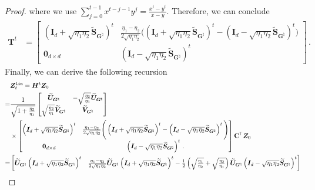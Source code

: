 \begin{proof}
    where we use $\sum_{j=0}^{t-1}x^{t-j-1}y^j=\frac{x^t-y^t}{x-y}$. Therefore, we can conclude 
    \begin{align*}
        \mathbf{T}^t & = \begin{bmatrix}
            \left(\bm I_d + \sqrt{\eta_1 \eta_2}\widetilde{\bm S}_{\bm G^\natural}\right)^t & \frac{\eta_1 - \eta_2}{2\sqrt{\eta_1 \eta_2}}\Bigg(\left(\bm I_d + \sqrt{\eta_1 \eta_2}\widetilde{\bm S}_{\bm G^\natural}\right)^t - \left(\bm I_d - \sqrt{\eta_1 \eta_2}\widetilde{\bm S}_{\bm G^\natural}\right)^t\Bigg)\\
            \bm 0_{d\times d} & \left(\bm I_d - \sqrt{\eta_1 \eta_2}\widetilde{\bm S}_{\bm G^\natural}\right)^t
        \end{bmatrix}\,.
    \end{align*}
    Finally, we can derive the following recursion
    {\begin{align*}
    & \bm Z^{\tt lin}_t
    =  \bm H^t\bm Z_0\\
    = & \frac{1}{\sqrt{1+\frac{\eta_2}{\eta_1}}}\begin{bmatrix}
        \widetilde{\bm U}_{\bm G^\natural} & -\sqrt{\frac{\eta_2}{\eta_1}}\widetilde{\bm U}_{\bm G^\natural}\\
        \sqrt{\frac{\eta_2}{\eta_1}}\widetilde{\bm V}_{\bm G^\natural} & \widetilde{\bm V}_{\bm G^\natural}
    \end{bmatrix}\\
    & \times \begin{bmatrix}
            \left(\bm I_d + \sqrt{\eta_1 \eta_2}\widetilde{\bm S}_{\bm G^\natural}\right)^t & \frac{\eta_1 - \eta_2}{2\sqrt{\eta_1 \eta_2}}\Bigg(\left(\bm I_d + \sqrt{\eta_1 \eta_2}\widetilde{\bm S}_{\bm G^\natural}\right)^t - \left(\bm I_d - \sqrt{\eta_1 \eta_2}\widetilde{\bm S}_{\bm G^\natural}\right)^t\Bigg)\\
            \bm 0_{d\times d} & \left(\bm I_d - \sqrt{\eta_1 \eta_2}\widetilde{\bm S}_{\bm G^\natural}\right)^t\,.
        \end{bmatrix}\mathbf{C}^{\!\top}\bm Z_0\\
    = & \begin{bmatrix}
            \widetilde{\bm U}_{\bm G^\natural}\left(\bm I_d + \sqrt{\eta_1 \eta_2}\widetilde{\bm S}_{\bm G^\natural}\right)^t & \frac{\eta_1 - \eta_2}{2\sqrt{\eta_1 \eta_2}}\widetilde{\bm U}_{\bm G^\natural}\left(\bm I_d + \sqrt{\eta_1 \eta_2}\widetilde{\bm S}_{\bm G^\natural}\right)^t - \frac{1}{2}\left(\sqrt{\frac{\eta_1}{\eta_2}}+\sqrt{\frac{\eta_2}{\eta_1}}\right)\widetilde{\bm U}_{\bm G^\natural}\left(\bm I_d - \sqrt{\eta_1 \eta_2}\widetilde{\bm S}_{\bm G^\natural}\right)^t\\

\end{bmatrix}
\end{align*}}
\end{proof}
